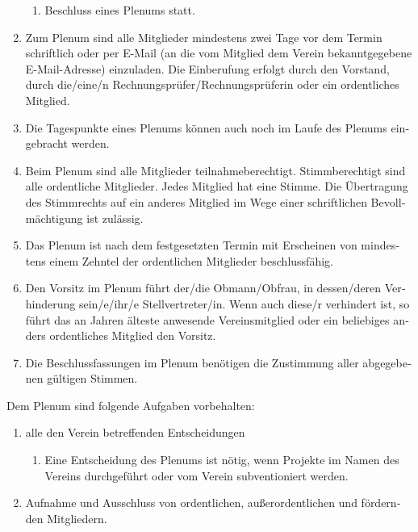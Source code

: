 \begin{otherlanguage}{german}
\begin{enumerate}[statutenenum]
\begin{enumerate}[statutenenum]
            \item Beschluss eines Plenums statt.
        \end{enumerate}

    \item Zum Plenum sind alle Mitglieder mindestens zwei Tage vor dem Termin schriftlich oder per E-Mail (an die vom Mitglied dem Verein bekanntgegebene E-Mail-Adresse) einzuladen.
        Die Einberufung erfolgt durch den Vorstand, durch die/eine/n Rechnungsprüfer/Rechnungsprüferin oder ein ordentliches Mitglied.

    \item Die Tagespunkte eines Plenums können auch noch im Laufe des Plenums eingebracht werden.

    \item Beim Plenum sind alle Mitglieder teilnahmeberechtigt.
        Stimmberechtigt sind alle ordentliche Mitglieder.
        Jedes Mitglied hat eine Stimme.
        Die Übertragung des Stimmrechts auf ein anderes Mitglied im Wege einer schriftlichen Bevollmächtigung ist zulässig.

    \item Das Plenum ist nach dem festgesetzten Termin mit Erscheinen von mindestens einem Zehntel der ordentlichen Mitglieder beschlussfähig.

    \item Den Vorsitz im Plenum führt der/die Obmann/Obfrau, in dessen/deren Verhinderung sein/e/ihr/e Stellvertreter/in.
        Wenn auch diese/r verhindert ist, so führt das an Jahren älteste anwesende Vereinsmitglied oder ein beliebiges anders ordentliches Mitglied den Vorsitz.

    \item Die Beschlussfassungen im Plenum benötigen die Zustimmung aller abgegebenen gültigen Stimmen.
\end{enumerate}


Dem Plenum sind folgende Aufgaben vorbehalten:

\begin{enumerate}[statutenenum]
    \item alle den Verein betreffenden Entscheidungen
        \begin{enumerate}[statutenenum]
            \item Eine Entscheidung des Plenums ist nötig, wenn Projekte im Namen des Vereins durchgeführt oder vom Verein subventioniert werden.
        \end{enumerate}
    \item Aufnahme und Ausschluss von ordentlichen, außerordentlichen und fördernden Mitgliedern.
\end{enumerate}


\end{otherlanguage}
